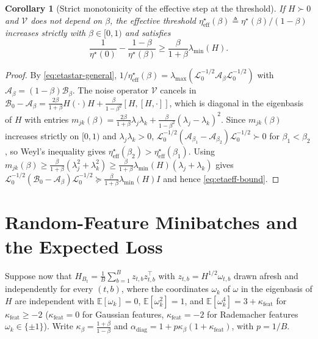 \documentclass[11pt]{article}
\newtheorem{corollary}[theorem]{Corollary}
\theoremstyle{remark}
\newcommand{\E}{\mathbb{E}}
\begin{document}
\begin{corollary}[Strict monotonicity of the effective step at the threshold]\label{cor:etaeff}
If $H \succ 0$ and $\mathcal V$ does not depend on $\beta$, the effective threshold $\eta^\star_{\mathrm{eff}}(\beta) \triangleq \eta^\star(\beta)/(1-\beta)$ increases strictly with $\beta \in [0,1)$ and satisfies
\begin{equation}\label{eq:etaeff-bound}
\frac{1}{\eta^\star(0)} - \frac{1-\beta}{\eta^\star(\beta)} \ge \frac{\beta}{1+\beta}\lambda_{\min}(H).
\end{equation}
\end{corollary}
\begin{proof}
By \eqref{eq:etastar-general}, $1/\eta^\star_{\mathrm{eff}}(\beta) = \lambda_{\max}(\mathcal L_0^{-1/2}\mathcal A_\beta\mathcal L_0^{-1/2})$ with $\mathcal A_\beta = (1-\beta)\mathcal B_\beta$. The noise operator $\mathcal V$ cancels in $\mathcal B_0 - \mathcal A_\beta = \frac{2\beta}{1+\beta}H(\cdot)H + \frac{\beta}{1-\beta^2}[H,[H,\cdot]]$, which is diagonal in the eigenbasis of $H$ with entries $m_{jk}(\beta) = \frac{2\beta}{1+\beta}\lambda_j\lambda_k + \frac{\beta}{1-\beta^2}(\lambda_j-\lambda_k)^2$. Since $m_{jk}(\beta)$ increases strictly on $[0,1)$ and $\lambda_j\lambda_k > 0$, $\mathcal L_0^{-1/2}(\mathcal A_{\beta_1} - \mathcal A_{\beta_2})\mathcal L_0^{-1/2} \succ 0$ for $\beta_1 < \beta_2$, so Weyl's inequality gives $\eta^\star_{\mathrm{eff}}(\beta_2) > \eta^\star_{\mathrm{eff}}(\beta_1)$. Using $m_{jk}(\beta) \ge \frac{\beta}{1+\beta}(\lambda_j^2+\lambda_k^2) \ge \frac{\beta}{1+\beta}\lambda_{\min}(H)(\lambda_j+\lambda_k)$ gives $\mathcal L_0^{-1/2}(\mathcal B_0 - \mathcal A_\beta)\mathcal L_0^{-1/2} \succeq \frac{\beta}{1+\beta}\lambda_{\min}(H)I$ and hence \eqref{eq:etaeff-bound}.
\end{proof}

\section{Random-Feature Minibatches and the Expected Loss}\label{sec:secular}

Suppose now that $H_{B_t} = \frac{1}{B}\sum_{b=1}^B z_{t,b}z_{t,b}^\top$ with $z_{t,b} = H^{1/2}\omega_{t,b}$ drawn afresh and independently for every $(t,b)$, where the coordinates $\omega_k$ of $\omega$ in the eigenbasis of $H$ are independent with $\E[\omega_k] = 0$, $\E[\omega_k^2] = 1$, and $\E[\omega_k^4] = 3 + \kappa_{\mathrm{feat}}$ for $\kappa_{\mathrm{feat}} \ge -2$ ($\kappa_{\mathrm{feat}} = 0$ for Gaussian features, $\kappa_{\mathrm{feat}} = -2$ for Rademacher features $\omega_k \in \{\pm 1\}$). Write $\kappa_\beta = \frac{1+\beta}{1-\beta}$ and $\alpha_{\mathrm{diag}} = 1 + p\kappa_\beta(1+\kappa_{\mathrm{feat}})$, with $p = 1/B$.
\end{document}

